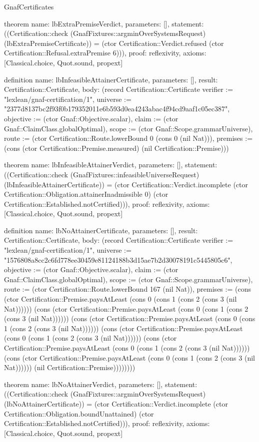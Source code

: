 \begin{lexlean}{GnafCertificates}
\begin{semanticmodule}
theorem{
  name: lbExtraPremiseVerdict,
  parameters: [],
  statement: ((Certification::check (GnafFixtures::argminOverSystemsRequest) (lbExtraPremiseCertificate)) = (ctor Certification::Verdict.refused (ctor Certification::Refusal.extraPremise 6))),
  proof: reflexivity{},
  axioms: [Classical.choice, Quot.sound, propext]
}

definition{
  name: lbInfeasibleAttainerCertificate,
  parameters: [],
  result: Certification::Certificate,
  body: (record Certification::Certificate {verifier := "lexlean/gnaf-certification/1", universe := "2377d8137bc2f93f0b179352011e6b593d0ea4243abac4f94cd9aaf1c05ec387", objective := (ctor Gnaf::Objective.scalar), claim := (ctor Gnaf::ClaimClass.globalOptimal), scope := (ctor Gnaf::Scope.grammarUniverse), route := (ctor Certification::Route.lowerBound 0 (cons 0 (nil Nat))), premises := (cons (ctor Certification::Premise.measured) (nil Certification::Premise))})
}

theorem{
  name: lbInfeasibleAttainerVerdict,
  parameters: [],
  statement: ((Certification::check (GnafFixtures::infeasibleUniverseRequest) (lbInfeasibleAttainerCertificate)) = (ctor Certification::Verdict.incomplete (ctor Certification::Obligation.attainerInadmissible 0) (ctor Certification::Established.notCertified))),
  proof: reflexivity{},
  axioms: [Classical.choice, Quot.sound, propext]
}

definition{
  name: lbNoAttainerCertificate,
  parameters: [],
  result: Certification::Certificate,
  body: (record Certification::Certificate {verifier := "lexlean/gnaf-certification/1", universe := "1576808a8cc2c6fd778ee30459e81124188b3d15ae7b2d30078191c5445805c6", objective := (ctor Gnaf::Objective.scalar), claim := (ctor Gnaf::ClaimClass.globalOptimal), scope := (ctor Gnaf::Scope.grammarUniverse), route := (ctor Certification::Route.lowerBound 167 (nil Nat)), premises := (cons (ctor Certification::Premise.paysAtLeast (cons 0 (cons 1 (cons 2 (cons 3 (nil Nat)))))) (cons (ctor Certification::Premise.paysAtLeast (cons 0 (cons 1 (cons 2 (cons 3 (nil Nat)))))) (cons (ctor Certification::Premise.paysAtLeast (cons 0 (cons 1 (cons 2 (cons 3 (nil Nat)))))) (cons (ctor Certification::Premise.paysAtLeast (cons 0 (cons 1 (cons 2 (cons 3 (nil Nat)))))) (cons (ctor Certification::Premise.paysAtLeast (cons 0 (cons 1 (cons 2 (cons 3 (nil Nat)))))) (cons (ctor Certification::Premise.paysAtLeast (cons 0 (cons 1 (cons 2 (cons 3 (nil Nat)))))) (nil Certification::Premise)))))))})
}

theorem{
  name: lbNoAttainerVerdict,
  parameters: [],
  statement: ((Certification::check (GnafFixtures::argminOverSystemsRequest) (lbNoAttainerCertificate)) = (ctor Certification::Verdict.incomplete (ctor Certification::Obligation.boundUnattained) (ctor Certification::Established.notCertified))),
  proof: reflexivity{},
  axioms: [Classical.choice, Quot.sound, propext]
}


\end{semanticmodule}
\end{lexlean}
